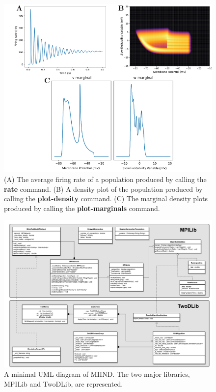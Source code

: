 \documentclass[utf8]{frontiersSCNS} %
\begin{document}
\begin{figure}[tb!]
  \centering
    \includegraphics[width=\linewidth]{images/izh_full_figure.pdf}
  \caption{(A) The average firing rate of a population produced by calling the \textbf{rate} command. (B) A density plot of the population produced by calling the \textbf{plot-density} command. (C) The marginal density plots produced by calling the \textbf{plot-marginals} command.}
  \label{fig:rate_density_marginal}
\end{figure}

\begin{figure}[!h]
  \centering
  \includegraphics[width=\columnwidth]{images/miind_uml.pdf}
  \caption{A minimal UML diagram of MIIND. The two major libraries, MPILib and TwoDLib, are represented.}
  \label{fig:uml}
\end{figure}
\end{document}
